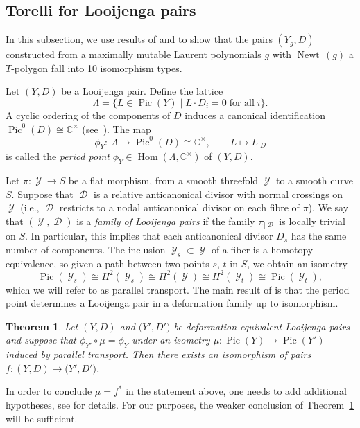 \documentclass[pdftex]{sigma}
\numberwithin{equation}{section}
\newtheorem{Theorem}{Theorem}[section]
\DeclareMathOperator{\Hom}{{Hom}}
\DeclareMathOperator{\Newt}{{Newt \,}}
\DeclareMathOperator{\Pic}{{Pic}}
\DeclareMathOperator{\cD}{\mathcal{D}}
\DeclareMathOperator{\cY}{\mathcal{Y}}
\newcommand{\CC}{\mathbb{C}}
\begin{document}
	\subsection{Torelli for Looijenga pairs}\label{sec:Torelli for Looijenga pairs}
In this subsection, we use results of \cite{Friedman} and \cite{GrossHackingKeelLooijengapairs} to show that the pairs $(Y_g, D)$ constructed from a maximally mutable Laurent polynomials $g$ with $\Newt(g)$ a $T$-polygon fall into 10 isomorphism types.
	\begin{Definition}
		Let $(Y, D)$ be a Looijenga pair. Define the lattice
		\[
		\Lambda=\{L \in \Pic(Y) \mid L \cdot D_i=0 \; \text{for all}\; i \}.
		\]
	A cyclic ordering of the components of $D$ induces a canonical identification $\Pic^0(D) \cong \CC^\times$ (see~\cite[Lemma~2.1]{GrossHackingKeelLooijengapairs}).
		The map
		\[
		\phi_Y \colon\ \Lambda \rightarrow \Pic^0(D) \cong \CC^\times, \qquad L \mapsto L_{|D}
		\]
		is called the {\it period point} $\phi_Y \in \Hom(\Lambda, \CC^\times)$ of $(Y, D)$.
	\end{Definition}
	Let $\pi \colon \cY \rightarrow S$ be a flat morphism, from a smooth threefold $\cY$ to a smooth curve $S$. Suppose that $\cD$ is a relative anticanonical divisor with normal crossings on $\cY$ (i.e., $\cD$ restricts to a nodal anticanonical divisor on each fibre of $\pi$). We say that $(\cY, \cD)$ is a \emph{family of Looijenga pairs} if the family $\pi_{|\cD}$ is locally trivial on $S$. In particular, this implies that each anticanonical divisor $D_s$ has the same number of components.
	The inclusion $\cY_s \subset \cY$ of a fiber is a homotopy equivalence, so given a path between two points $s$, $t$ in $S$, we obtain an isometry
	\[
	\Pic(\cY_s) \cong H^2(\cY_s) \cong H^2(\cY) \cong H^2(\cY_t) \cong \Pic(\cY_t),
	\]
	which we will refer to as parallel transport.
	The main result of \cite{GrossHackingKeelLooijengapairs} is that the period point determines a Looijenga pair in a deformation family up to isomorphism.
	\begin{Theorem} \label{thm:torelli}
		Let $(Y,D)$ and $\bigl(Y',D'\bigr)$ be deformation-equivalent Looijenga pairs and
		suppose that $
		 \phi_{Y'} \circ \mu = \phi_{Y}$
		 under an isometry $\mu \colon \Pic(Y) \to \Pic(Y')$ induced by parallel transport.
		 Then there exists an isomorphism of pairs
		 $f\colon (Y,D) \to \bigl(Y',D'\bigr)$.
	\end{Theorem}
	\begin{Remark}
		In order to conclude $\mu=f^*$ in the statement above, one needs to add additional hypotheses, see \cite[Theorem 1.8]{GrossHackingKeelLooijengapairs} for details. For our purposes, the weaker conclusion of Theorem~\ref{thm:torelli} will be sufficient.
	\end{Remark}
\end{document}
